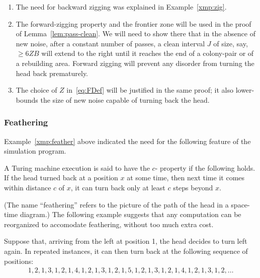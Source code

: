\documentclass[11pt]{memoir}
\theoremstyle{definition} %
\renewcommand{\ge}{\geq}
\def\B{B}
\newcommand{\Z}{Z} %
\begin{document}
\begin{remarks}\label{rem:zigging-choices}
  \begin{enumerate}
  \item The need for backward zigging was explained in Example~\ref{xmp:zig}.
  \item The forward-zigging property and the frontier zone
    will be used in the proof of Lemma~\ref{lem:pass-clean}.
    We will need to show there that
    in the absence of new noise, after a constant number of passes, a clean interval \( J \)
    of size, say, \( \ge 6\Z\B \) will extend to the right until it reaches
    the end of a colony-pair or of a rebuilding area.
    Forward zigging will prevent any disorder from turning the head back prematurely.
  \item The choice of  \( \Z \) in~\eqref{eq:FDef} will be justified in the same proof; 
    it also lower-bounds the size of new noise capable of turning back the head.
  \end{enumerate}
\end{remarks}

\subsubsection{Feathering}\label{sec:feathering}

Example~\ref{xmp:feather} above indicated the need for the
following feature of the simulation program.

\begin{definition}[Feathering]\label{def:feathering}
A Turing machine execution is said to have the \( c \)- property if the following holds.
If the head turned back at a position \( x \) at some time, then next time it comes within distance \( c \)
of \( x \), it can turn back only at least \( c \) steps beyond \( x \).
\end{definition}

(The name ``feathering'' refers to the picture of the path of the head in a space-time diagram.)
The following example suggests that any computation can be reorganized to accomodate feathering,
without too much extra cost.

\begin{example}[1-feathering]\label{xmp:feathering}
Suppose that, arriving from the left at position 1, the head decides to turn left again.
In repeated instances, it can then turn back at the following sequence of positions:
\begin{align*}
 1, 2, 1, 3, 1, 2, 1, 4, 1, 2, 1, 3, 1, 2, 1, 5, 1, 2, 1, 3, 1, 2, 1, 4, 1, 2, 1, 3, 1, 2, \dots
 \end{align*}
\end{example}
\end{document}
